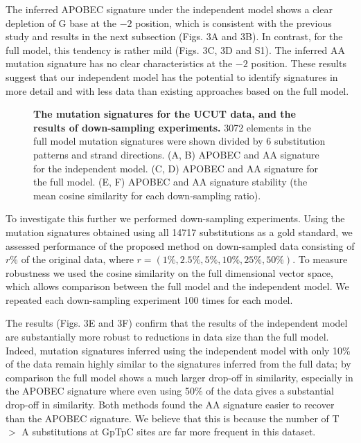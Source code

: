 \documentclass[10pt,letterpaper]{article}
\begin{document}
The inferred APOBEC signature under the independent model
shows a clear depletion of G base at the $-2$ position,
which is consistent with the previous study \cite{pmid23318258} and results in the next subsection (Figs. 3A and 3B).
In contrast, for the full model, this tendency is rather mild (Figs. 3C, 3D and S1).
The inferred AA mutation signature has no clear characteristics at the $-2$ position.
These results suggest that our independent model has the potential
to identify signatures in more detail and with less data than existing approaches based on the full model.

\begin{figure}[h]
\caption{{\bf The mutation signatures for the UCUT data, and the results of down-sampling experiments.}
3072 elements in the full model mutation signatures were shown divided by 6 substitution patterns and strand directions.
(A, B) APOBEC and AA signature for the independent model.
(C, D) APOBEC and AA signature for the full model.
(E, F) APOBEC and AA signature stability (the mean cosine similarity for each down-sampling ratio).}
\label{UCUT}
\end{figure}

To investigate this further we performed down-sampling experiments.
Using the mutation signatures obtained using all 14717 substitutions as a gold standard, 
we assessed performance of the proposed method on down-sampled data consisting of $r\%$ of the original data, where  $r=(1\%, 2.5\%, 5\%, 10\%, 25\%, 50\%)$.
To measure robustness we used the cosine similarity on the 
full dimensional vector space, which allows comparison between the full model and the independent model.
We repeated each down-sampling experiment 100 times for each model.


The results (Figs. 3E and 3F)
confirm that the results of the independent model 
are substantially more robust to reductions in data size than the full model. Indeed, mutation signatures inferred using the independent model with only 10\% of the data 
remain highly similar to the signatures inferred from the full data; by comparison the full model shows a much larger drop-off in similarity, especially in the APOBEC signature where even using 50\% of the data gives a substantial drop-off in similarity. Both methods found the AA signature 
easier to recover than the APOBEC signature.
We believe that this is because the number of T $>$ A substitutions at GpTpC sites are far more frequent in this dataset.
\end{document}
